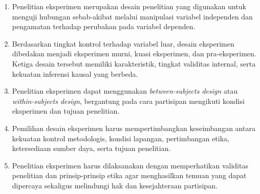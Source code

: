 \documentclass[
  indonesian,
  letterpaper,
  DIV=11,
  numbers=noendperiod]{scrreprt}
\providecommand{\tightlist}{%
  \setlength{\itemsep}{0pt}\setlength{\parskip}{0pt}}
\begin{document}
\begin{tcolorbox}[enhanced jigsaw, colframe=quarto-callout-tip-color-frame, toptitle=1mm, breakable, leftrule=.75mm, arc=.35mm, toprule=.15mm, colback=white, colbacktitle=quarto-callout-tip-color!10!white, bottomtitle=1mm, bottomrule=.15mm, titlerule=0mm, title=\textcolor{quarto-callout-tip-color}{\faLightbulb}\hspace{0.5em}{Rangkuman}, coltitle=black, left=2mm, opacitybacktitle=0.6, opacityback=0, rightrule=.15mm]

\begin{enumerate}
\def\labelenumi{\arabic{enumi}.}
\tightlist
\item
  Penelitian eksperimen merupakan desain penelitian yang digunakan untuk
  menguji hubungan sebab-akibat melalui manipulasi variabel independen
  dan pengamatan terhadap perubahan pada variabel dependen.
\item
  Berdasarkan tingkat kontrol terhadap variabel luar, desain eksperimen
  dibedakan menjadi eksperimen murni, kuasi eksperimen, dan
  pra-eksperimen. Ketiga desain tersebut memiliki karakteristik, tingkat
  validitas internal, serta kekuatan inferensi kausal yang berbeda.
\item
  Penelitian eksperimen dapat menggunakan \emph{between-subjects design}
  atau \emph{within-subjects design}, bergantung pada cara partisipan
  mengikuti kondisi eksperimen dan tujuan penelitian.
\item
  Pemilihan desain eksperimen harus mempertimbangkan keseimbangan antara
  kekuatan kontrol metodologis, kondisi lapangan, pertimbangan etika,
  ketersediaan sumber daya, serta tujuan penelitian.
\item
  Penelitian eksperimen harus dilaksanakan dengan memperhatikan
  validitas penelitian dan prinsip-prinsip etika agar menghasilkan
  temuan yang dapat dipercaya sekaligus melindungi hak dan kesejahteraan
  partisipan.
\end{enumerate}

\end{tcolorbox}
\end{document}
